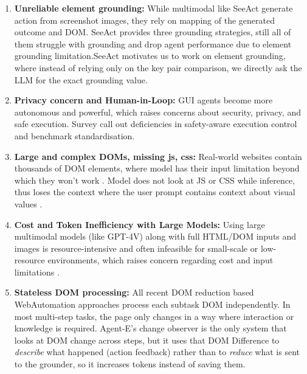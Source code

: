 \begin{enumerate}
    \item \textbf{Unreliable element grounding:} While multimodal like SeeAct \cite{SeeAct} generate action from screenshot images, they rely on mapping of the generated outcome and DOM. SeeAct \cite{SeeAct} provides three grounding strategies, still all of them struggle with grounding and drop agent performance due to element grounding limitation.SeeAct \cite{SeeAct} motivates us to work on element grounding, where instead of relying only on the key pair comparison, we directly ask the LLM for the exact grounding value.

    \item \textbf{Privacy concern and Human-in-Loop:} GUI agents become more autonomous and powerful, which raises concerns about security, privacy, and safe execution. Survey \cite{tang2025surveymllmbasedguiagents} \cite{ning2025surveywebagentsnextgenerationai} call out deficiencies in safety-aware execution control and benchmark standardisation.

    \item \textbf{Large and complex DOMs, missing js, css:} Real-world websites contain thousands of DOM elements, where model has their input limitation beyond which they won't work \cite{wang2025guiagentsfoundationmodels}. Model does not look at JS or CSS while inference, thus loses the context where the user prompt contains context about visual values \cite{wang2025guiagentsfoundationmodels}. 
    
    \item \textbf{Cost and Token Inefficiency with Large Models:} Using large multimodal models (like GPT-4V) along with full HTML/DOM inputs and images is resource-intensive and often infeasible for small-scale or low-resource environments, which raises concern regarding cost and input limitations \cite{tang2025surveymllmbasedguiagents}.

    \item \textbf{Stateless DOM processing:} All recent DOM reduction based WebAutomation approaches \cite{zhang2025prune4web} \cite{lai2024autowebglm} \cite{schiepanski2025d2snap}  process each subtask DOM independently. In most multi-step tasks, the page only changes in a way where interaction or knowledge is required. Agent-E's change observer \cite{tarsariya2024agente} is the only system that looks at DOM change across steps, but it uses that DOM Difference to \textit{describe} what happened (action feedback) rather than to \textit{reduce} what is sent to the grounder, so it increases tokens instead of saving them.


\end{enumerate}

